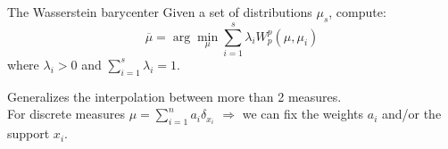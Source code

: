 \documentclass[pdf,aspectratio=169,10pt]{beamer}
\begin{document}
\begin{frame}{The Wasserstein barycenter}
    Given a set of distributions $\mu_s$, compute: 
    \begin{equation*}
        \overline{\mu} = \arg \min_{\mu} \sum_{i=1}^s \lambda_i W^p_p(\mu, \mu_i)
    \end{equation*}
    where $\lambda_i > 0$ and $\sum_{i=1}^s \lambda_i  = 1$.\vspace{1em}

    Generalizes the interpolation between more than 2 measures.\\
    For discrete measures $\mu = \sum_{i=1}^n a_i \delta_{x_i}$ $\Rightarrow$ we can fix the weights $a_i$ and/or the support $x_i$.
\end{frame}
\end{document}

